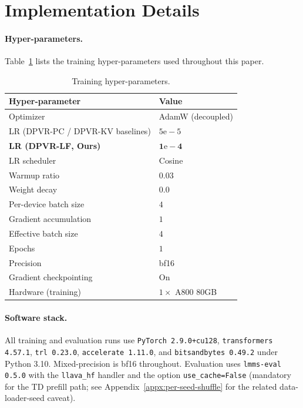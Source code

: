 \documentclass[a4paper,fleqn,review]{cas-sc}
\newcommand{\dpvrlf}{DPVR-LF}
\newcommand{\dpvrpc}{DPVR-PC}
\newcommand{\dpvrkv}{DPVR-KV}
\begin{document}
\section{Implementation Details}\label{appx:impl}

\paragraph{Hyper-parameters.}
Table~\ref{tab:hyper} lists the training hyper-parameters used
throughout this paper.

\begin{table}[t]
\centering
\caption{Training hyper-parameters.}
\label{tab:hyper}
\footnotesize
\setlength{\tabcolsep}{4pt}
\begin{tabular}{ll}
\toprule
Hyper-parameter & Value \\
\midrule
Optimizer & AdamW (decoupled) \\
LR (\dpvrpc{} / \dpvrkv{} baselines) & $5\mathrm{e}{-}5$ \\
\textbf{LR (\dpvrlf{}, Ours)} & $\bm{1\mathrm{e}{-}4}$ \\
LR scheduler & Cosine \\
Warmup ratio & $0.03$ \\
Weight decay & $0.0$ \\
Per-device batch size & $4$ \\
Gradient accumulation & $1$ \\
Effective batch size & $4$ \\
Epochs & $1$ \\
Precision & bf16 \\
Gradient checkpointing & On \\
Hardware (training) & $1\times$ A800 80GB \\
\bottomrule
\end{tabular}
\end{table}

\paragraph{Software stack.}
All training and evaluation runs use \texttt{PyTorch 2.9.0+cu128},
\texttt{transformers 4.57.1}, \texttt{trl 0.23.0},
\texttt{accelerate 1.11.0}, and \texttt{bitsandbytes 0.49.2}
under Python 3.10. Mixed-precision is bf16 throughout. Evaluation
uses \texttt{lmms-eval 0.5.0} with the \texttt{llava\_hf} handler
and the option \texttt{use\_cache=False} (mandatory for the TD
prefill path; see Appendix~\ref{appx:per-seed-shuffle} for the
related data-loader-seed caveat).
\end{document}
